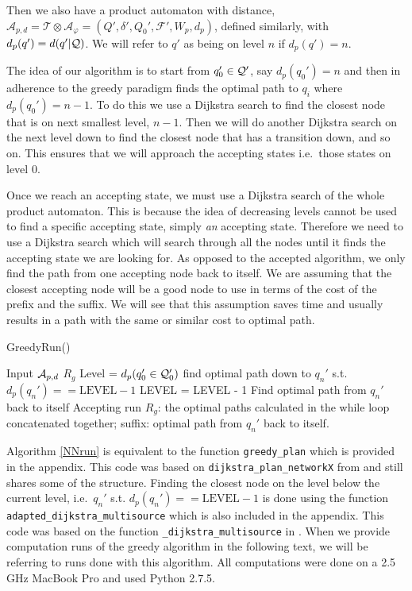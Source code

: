 Then we also have a product automaton with distance, $\mathcal{A}_{p,d} = \mathcal{T} \otimes \mathcal{A}_\varphi = (Q', \delta', Q_0', \mathcal{F}', W_p, d_p)$, defined similarly, with $d_p(q') = d(q'|\mathcal{Q})$. We will refer to $q'$ as being on level $n$ if $d_p(q') = n$.

The idea of our algorithm is to start from $q_0' \in \mathcal{Q}'$, say $d_p(q_0')=n$ and then in adherence to the greedy paradigm finds the optimal path to $q_i$ where $d_p(q_0')=n-1$. To do this we use a Dijkstra search to find the closest node that is on next smallest level, $n-1$. Then we will do another Dijkstra search on the next level down to find the closest node that has a transition down, and so on. This ensures that we will approach the accepting states i.e.\ those states on level 0. 

Once we reach an accepting state, we must use a Dijkstra search of the whole product automaton. This is because the idea of decreasing levels cannot be used to find a specific accepting state, simply \textit{an} accepting state. Therefore we need to use a Dijkstra search which will search through all the nodes until it finds the accepting state we are looking for. As opposed to the accepted algorithm, we only find the path from one accepting node back to itself. We are assuming that the closest accepting node will be a good node to use in terms of the cost of the prefix and the suffix. We will see that this assumption saves time and usually results in a path with the same or similar cost to optimal path. %
\begin{algorithm}
\caption{GreedyRun()}\label{NNrun}
\begin{algorithmic}[1]
\Require Input $\mathcal{A}_{p,d}$
\Ensure $R_{g}$
\State Level = $d_p(q_0' \in \mathcal{Q}_0')$
\State find optimal path down to $q_n'$ s.t. $d_p(q_n')==\text{LEVEL}-1$ %
\State	LEVEL = LEVEL - 1
\EndWhile
\State Find optimal path from $q_n'$ back to itself
\State Accepting run $R_g$: the optimal paths calculated in the while loop concatenated together; suffix: optimal path from $q_n'$ back to itself.
\end{algorithmic}
\end{algorithm}

Algorithm \ref{NNrun} is equivalent to the function \texttt{greedy\_plan} which is provided in the appendix. This code was based on \texttt{dijkstra\_plan\_networkX} from \cite{pMasGit} and still shares some of the structure. Finding the closest node on the level below the current level, i.e.\ $q_n'$ s.t. $d_p(q_n')==\text{LEVEL}-1$ is done using the function \texttt{adapted\_dijkstra\_multisource} which is also included in the appendix. This code was based on the function  \texttt{\_dijkstra\_multisource} in \cite{schult08}. When we provide computation runs of the greedy algorithm in the following text, we will be referring to runs done with this algorithm. All computations were done on a 2.5 GHz MacBook Pro and used Python 2.7.5.%

